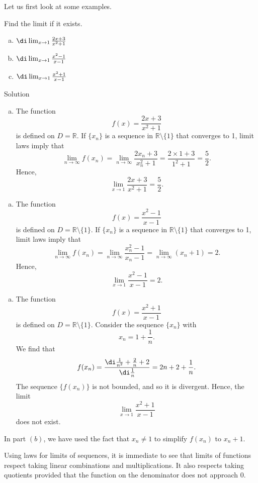  Let us first look at some examples. 
 \begin{example}{}
 Find the  limit if it exists.
 \begin{enumerate}[(a)]
 \item
 $\di\lim_{x\rightarrow 1}\frac{2x+3}{x^2+1}$
 
 \item $\di \lim_{x\rightarrow 1}\frac{x^2-1}{x-1}$
 
 \item $\di \lim_{x\rightarrow 1}\frac{x^2+1}{x-1}$
 \end{enumerate}
 \end{example}
 \begin{solution}{Solution}
 \begin{enumerate}[(a)]
 \item The function \[f(x)= \frac{2x+3}{x^2+1}\] is defined on $D=\mathbb{R}$. If $\{x_n\}$ is a sequence in $\mathbb{R}\setminus \{1\}$ that converges to 1, limit laws imply that
 \[\lim_{n\rightarrow\infty}f(x_n)=\lim_{n\rightarrow \infty}\frac{2x_n+3}{x_n^2+1}=\frac{2\times 1+3}{1^2+1}=\frac{5}{2}.\]Hence,
 \[\lim_{x\rightarrow 1}\frac{2x+3}{x^2+1}=\frac{5}{2}.\]\end{enumerate} \bs
 \begin{enumerate}[(b)] 
  \item The function \[f(x)= \frac{x^2-1}{x-1}\] is defined on $D=\mathbb{R}\setminus\{1\}$. If $\{x_n\}$ is a sequence in $\mathbb{R}\setminus \{1\}$ that converges to 1, limit laws imply that
 \[\lim_{n\rightarrow\infty}f(x_n)=\lim_{n\rightarrow \infty}\frac{x_n^2-1}{x_n-1}=\lim_{n\rightarrow \infty}(x_n+1)=2.\] Hence,
 \[\lim_{x\rightarrow 1}\frac{x^2-1}{x-1}=2.\]\end{enumerate}
 \begin{enumerate}[(c)]
 \item  The function \[f(x)= \frac{x^2+1}{x-1}\] is defined on $D=\mathbb{R}\setminus\{1\}$. Consider the sequence $\{x_n\}$ with 
 \[x_n=1+\frac{1}{n}.\]
 We find that \[f(x_n)=\frac{\di \frac{1}{n^2}+\frac{2}{n}+2}{\di \frac{1}{n}}=2n+2+\frac{1}{n}.\]The sequence $\{f(x_n)\}$ is not bounded, and so it is divergent. Hence, the limit
  \[\lim_{x\rightarrow 1}\frac{x^2+1}{x-1} \]does not exist.
 \end{enumerate}
 \end{solution}
 In part $(b)$, we have used the fact that $x_n\neq 1$  to simplify $f(x_n)$ to $x_n+1$. 
 
 Using   laws for limits of sequences, it is immediate to  see that limits of functions respect taking linear combinations and multiplications. It also respects taking quotients provided that the function on the denominator does not approach 0.
 

